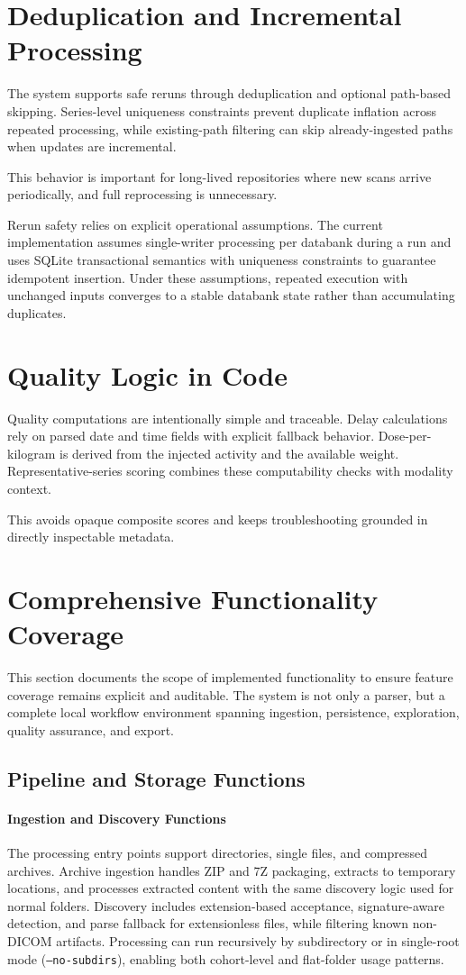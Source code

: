 \section{Deduplication and Incremental Processing}
The system supports safe reruns through deduplication and optional path-based skipping. Series-level uniqueness constraints prevent duplicate inflation across repeated processing, while existing-path filtering can skip already-ingested paths when updates are incremental.

This behavior is important for long-lived repositories where new scans arrive periodically, and full reprocessing is unnecessary.

Rerun safety relies on explicit operational assumptions. The current implementation assumes single-writer processing per databank during a run and uses SQLite transactional semantics with uniqueness constraints to guarantee idempotent insertion. Under these assumptions, repeated execution with unchanged inputs converges to a stable databank state rather than accumulating duplicates.

\section{Quality Logic in Code}
Quality computations are intentionally simple and traceable. Delay calculations rely on parsed date and time fields with explicit fallback behavior. Dose-per-kilogram is derived from the injected activity and the available weight. Representative-series scoring combines these computability checks with modality context.

This avoids opaque composite scores and keeps troubleshooting grounded in directly inspectable metadata.
\section{Comprehensive Functionality Coverage}
This section documents the scope of implemented functionality to ensure feature coverage remains explicit and auditable. The system is not only a parser, but a complete local workflow environment spanning ingestion, persistence, exploration, quality assurance, and export.

\subsection{Pipeline and Storage Functions}
\paragraph{Ingestion and Discovery Functions}
The processing entry points support directories, single files, and compressed archives. Archive ingestion handles ZIP and 7Z packaging, extracts to temporary locations, and processes extracted content with the same discovery logic used for normal folders. Discovery includes extension-based acceptance, signature-aware detection, and parse fallback for extensionless files, while filtering known non-DICOM artifacts. Processing can run recursively by subdirectory or in single-root mode (\texttt{--no-subdirs}), enabling both cohort-level and flat-folder usage patterns.

